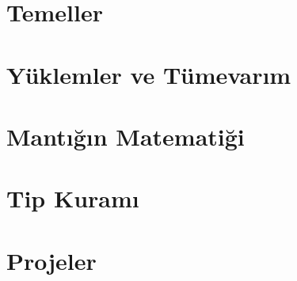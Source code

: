 \documentclass[11pt, a4paper, twoside, openany]{book}
\begin{document}
\frontmatter



\tableofcontents

\mainmatter
\part{Temeller}

\part{Yüklemler ve Tümevarım}

\part{Mantığın Matematiği}

\part{Tip Kuramı}

\part{Projeler}

\appendix



\backmatter

\renewcommand{\bibname}{Kaynakça}

\end{document}
